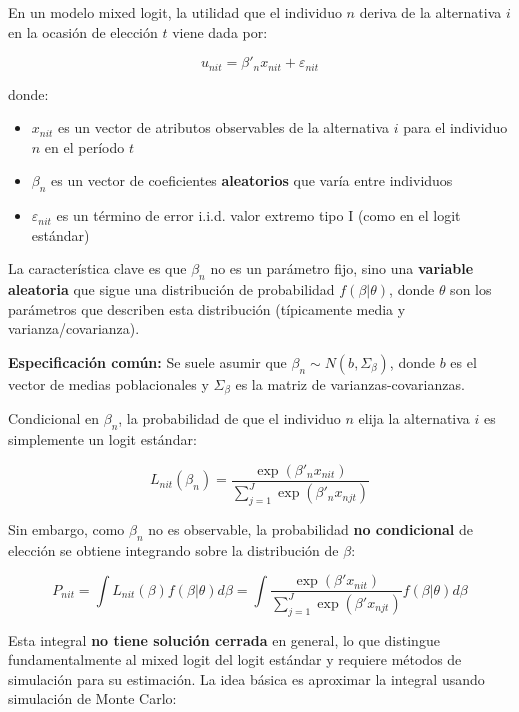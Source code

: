 \documentclass[
]{book}
\providecommand{\tightlist}{%
  \setlength{\itemsep}{0pt}\setlength{\parskip}{0pt}}
\begin{document}
En un modelo mixed logit, la utilidad que el individuo \(n\) deriva de la alternativa \(i\) en la ocasión de elección \(t\) viene dada por:

\begin{equation}
u_{nit} = \beta'_n x_{nit} + \varepsilon_{nit}
\label{eq:mixedutil}
\end{equation}

donde:

\begin{itemize}
\tightlist
\item
  \(x_{nit}\) es un vector de atributos observables de la alternativa \(i\) para el individuo \(n\) en el período \(t\)
\item
  \(\beta_n\) es un vector de coeficientes \textbf{aleatorios} que varía entre individuos
\item
  \(\varepsilon_{nit}\) es un término de error i.i.d. valor extremo tipo I (como en el logit estándar)
\end{itemize}

La característica clave es que \(\beta_n\) no es un parámetro fijo, sino una \textbf{variable aleatoria} que sigue una distribución de probabilidad \(f(\beta | \theta)\), donde \(\theta\) son los parámetros que describen esta distribución (típicamente media y varianza/covarianza).

\textbf{Especificación común:} Se suele asumir que \(\beta_n \sim N(b, \Sigma_\beta)\), donde \(b\) es el vector de medias poblacionales y \(\Sigma_\beta\) es la matriz de varianzas-covarianzas.

Condicional en \(\beta_n\), la probabilidad de que el individuo \(n\) elija la alternativa \(i\) es simplemente un logit estándar:

\begin{equation}
L_{nit}(\beta_n) = \frac{\exp(\beta'_n x_{nit})}{\sum_{j=1}^J \exp(\beta'_n x_{njt})}
\label{eq:condlogit}
\end{equation}

Sin embargo, como \(\beta_n\) no es observable, la probabilidad \textbf{no condicional} de elección se obtiene integrando sobre la distribución de \(\beta\):

\begin{equation}
P_{nit} = \int L_{nit}(\beta) f(\beta | \theta) d\beta = \int \frac{\exp(\beta' x_{nit})}{\sum_{j=1}^J \exp(\beta' x_{njt})} f(\beta | \theta) d\beta
\label{eq:mixedprob}
\end{equation}

Esta integral \textbf{no tiene solución cerrada} en general, lo que distingue fundamentalmente al mixed logit del logit estándar y requiere métodos de simulación para su estimación. La idea básica es aproximar la integral usando simulación de Monte Carlo:
\end{document}
